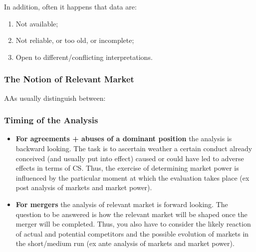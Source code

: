             \noindent
            In addition, often it happens that data are:
            \begin{enumerate}
                \item Not available;
                \item Not reliable, or too old, or incomplete;
                \item Open to different/conflicting interpretations.
            \end{enumerate}

        \subsubsection{The Notion of Relevant Market}

            AAs usually distinguish between:
    
    
    

        \subsubsection{Timing of the Analysis}

            \begin{itemize}
                \item \textbf{For agreements + abuses of a dominant position} the analysis is backward looking. The task is to ascertain weather a certain conduct already conceived (and usually put into effect) caused or could have led to adverse effects in terms of CS. Thus, the exercise of determining market power is influenced by the particular moment at which the evaluation takes place (ex post analysis of markets and market power).
                \item \textbf{For mergers} the analysis of relevant market is forward looking. The question to be answered is how the relevant market will be shaped once the merger will be completed. Thus, you also have to consider the likely reaction of actual and potential competitors and the possible evolution of markets in the short/medium run (ex ante analysis of markets and market power).
            \end{itemize}

